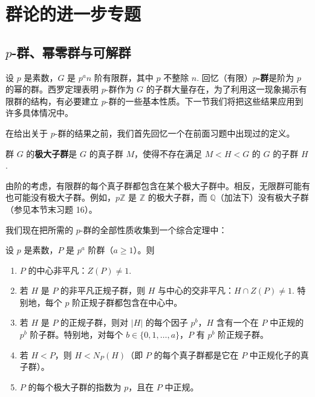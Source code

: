 

\setcounter{chapter}{5}

\chapter{群论的进一步专题}

\section{\(p\)-群、幂零群与可解群}

设 \(p\) 是素数，\(G\) 是 \(p^a n\) 阶有限群，其中 \(p\) 不整除 \(n\). 回忆（有限）\textbf{\(p\)-群}是阶为 \(p\) 的幂的群。西罗定理表明 \(p\)-群作为 \(G\) 的子群大量存在，为了利用这一现象揭示有限群的结构，有必要建立 \(p\)-群的一些基本性质。下一节我们将把这些结果应用到许多具体情况中。

在给出关于 \(p\)-群的结果之前，我们首先回忆一个在前面习题中出现过的定义。

\begin{definition}
群 \(G\) 的\textbf{极大子群}是 \(G\) 的真子群 \(M\)，使得不存在满足 \(M < H < G\) 的 \(G\) 的子群 \(H\).
\end{definition}

由阶的考虑，有限群的每个真子群都包含在某个极大子群中。相反，无限群可能有也可能没有极大子群。例如，\(p\mathbb{Z}\) 是 \(\mathbb{Z}\) 的极大子群，而 \(\mathbb{Q}\)（加法下）没有极大子群（参见本节末习题 16）。

我们现在把所需的 \(p\)-群的全部性质收集到一个综合定理中：

\begin{theorem}\label{thm:6.1}
设 \(p\) 是素数，\(P\) 是 \(p^a\) 阶群（\(a \geq 1\)）。则

\begin{enumerate}[label=(\arabic*)]
\item \(P\) 的中心非平凡：\(Z(P) \neq 1\).
\item 若 \(H\) 是 \(P\) 的非平凡正规子群，则 \(H\) 与中心的交非平凡：\(H \cap Z(P) \neq 1\). 特别地，每个 \(p\) 阶正规子群都包含在中心中。
\item 若 \(H\) 是 \(P\) 的正规子群，则对 \(|H|\) 的每个因子 \(p^b\)，\(H\) 含有一个在 \(P\) 中正规的 \(p^b\) 阶子群。特别地，对每个 \(b \in \{0, 1, \ldots, a\}\)，\(P\) 有 \(p^b\) 阶正规子群。
\item 若 \(H < P\)，则 \(H < N_P(H)\)（即 \(P\) 的每个真子群都是它在 \(P\) 中正规化子的真子群）。
\item \(P\) 的每个极大子群的指数为 \(p\)，且在 \(P\) 中正规。
\end{enumerate}
\end{theorem}

